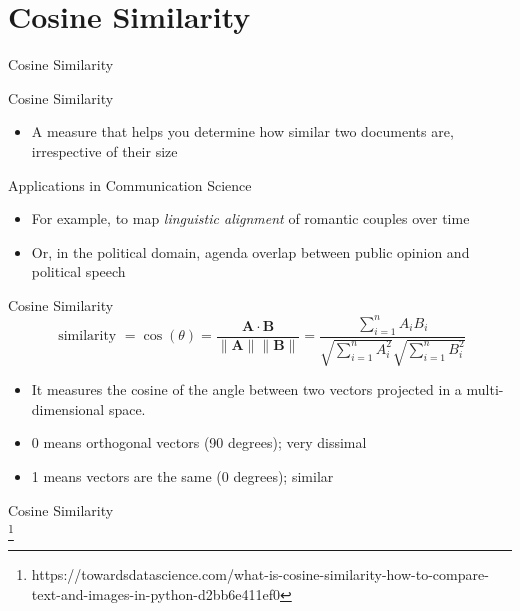 \section{Cosine Similarity}

\begin{frame}{Cosine Similarity}
	\begin{block}{Cosine Similarity}
		\begin{itemize}[<+>]
			\item A measure that helps you determine how similar two documents are, irrespective of their size
		\end{itemize}
	
		\begin{exampleblock}{Applications in Communication Science}
		\begin{itemize}[<+>]
			\item For example, to map \emph{linguistic alignment} of romantic couples over time \parencite{Brinberg2021}
			\item Or, in the political domain, agenda overlap between public opinion and political speech \parencite{Hager2020} 
		\end{itemize}
	\end{exampleblock}
	\end{block}
\end{frame}

\begin{frame}{Cosine Similarity} 
$$
\text { similarity }=\cos (\theta)=\frac{\mathbf{A} \cdot \mathbf{B}}{\|\mathbf{A}\|\|\mathbf{B}\|}=\frac{\sum_{i=1}^{n} A_{i} B_{i}}{\sqrt{\sum_{i=1}^{n} A_{i}^{2}} \sqrt{\sum_{i=1}^{n} B_{i}^{2}}}
$$

\pause

\begin{itemize}[<+>]
\item It measures the cosine of the angle between two vectors projected in a multi-dimensional space.
\item 0 means orthogonal vectors (90 degrees); very dissimal
\item 1 means vectors are the same (0 degrees); similar
\end{itemize}
\end{frame}


\begin{frame}{Cosine Similarity}
	\\
\footnote{https://towardsdatascience.com/what-is-cosine-similarity-how-to-compare-text-and-images-in-python-d2bb6e411ef0}
\end{frame}

